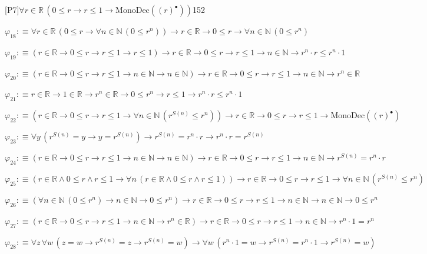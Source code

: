 \begin{fullproof}{[P7]}{$\forall r \in \mathbb{R}\,(0 \leq r \to r \leq 1 \to \mathrm{MonoDec}({(r)^{\bullet}}))$}{152}
\begin{abbrevlist}
\item $\varphi_{18} :\equiv \forall r \in \mathbb{R}\,(0 \leq r \to \forall n \in \mathbb{N}\,(0 \leq {{r}^{n}})) \to r \in \mathbb{R} \to 0 \leq r \to \forall n \in \mathbb{N}\,(0 \leq {{r}^{n}})$
\item $\varphi_{19} :\equiv (r \in \mathbb{R} \to 0 \leq r \to r \leq 1 \to r \leq 1) \to r \in \mathbb{R} \to 0 \leq r \to r \leq 1 \to n \in \mathbb{N} \to {{r}^{n}} \cdot r \leq {{r}^{n}} \cdot 1$
\item $\varphi_{20} :\equiv (r \in \mathbb{R} \to 0 \leq r \to r \leq 1 \to n \in \mathbb{N} \to n \in \mathbb{N}) \to r \in \mathbb{R} \to 0 \leq r \to r \leq 1 \to n \in \mathbb{N} \to {{r}^{n}} \in \mathbb{R}$
\item $\varphi_{21} :\equiv r \in \mathbb{R} \to 1 \in \mathbb{R} \to {{r}^{n}} \in \mathbb{R} \to 0 \leq {{r}^{n}} \to r \leq 1 \to {{r}^{n}} \cdot r \leq {{r}^{n}} \cdot 1$
\item $\varphi_{22} :\equiv (r \in \mathbb{R} \to 0 \leq r \to r \leq 1 \to \forall n \in \mathbb{N}\,({{r}^{S(n)}} \leq {{r}^{n}})) \to r \in \mathbb{R} \to 0 \leq r \to r \leq 1 \to \mathrm{MonoDec}({(r)^{\bullet}})$
\item $\varphi_{23} :\equiv \forall y\,({{r}^{S(n)}} = y \to y = {{r}^{S(n)}}) \to {{r}^{S(n)}} = {{r}^{n}} \cdot r \to {{r}^{n}} \cdot r = {{r}^{S(n)}}$
\item $\varphi_{24} :\equiv (r \in \mathbb{R} \to 0 \leq r \to r \leq 1 \to n \in \mathbb{N} \to n \in \mathbb{N}) \to r \in \mathbb{R} \to 0 \leq r \to r \leq 1 \to n \in \mathbb{N} \to {{r}^{S(n)}} = {{r}^{n}} \cdot r$
\item $\varphi_{25} :\equiv (r \in \mathbb{R} \land 0 \leq r \land r \leq 1 \to \forall n\,(r \in \mathbb{R} \land 0 \leq r \land r \leq 1)) \to r \in \mathbb{R} \to 0 \leq r \to r \leq 1 \to \forall n \in \mathbb{N}\,({{r}^{S(n)}} \leq {{r}^{n}})$
\item $\varphi_{26} :\equiv (\forall n \in \mathbb{N}\,(0 \leq {{r}^{n}}) \to n \in \mathbb{N} \to 0 \leq {{r}^{n}}) \to r \in \mathbb{R} \to 0 \leq r \to r \leq 1 \to n \in \mathbb{N} \to n \in \mathbb{N} \to 0 \leq {{r}^{n}}$
\item $\varphi_{27} :\equiv (r \in \mathbb{R} \to 0 \leq r \to r \leq 1 \to n \in \mathbb{N} \to {{r}^{n}} \in \mathbb{R}) \to r \in \mathbb{R} \to 0 \leq r \to r \leq 1 \to n \in \mathbb{N} \to {{r}^{n}} \cdot 1 = {{r}^{n}}$
\item $\varphi_{28} :\equiv \forall z\,\forall w\,(z = w \to {{r}^{S(n)}} = z \to {{r}^{S(n)}} = w) \to \forall w\,({{r}^{n}} \cdot 1 = w \to {{r}^{S(n)}} = {{r}^{n}} \cdot 1 \to {{r}^{S(n)}} = w)$

\end{abbrevlist}
\end{fullproof}
